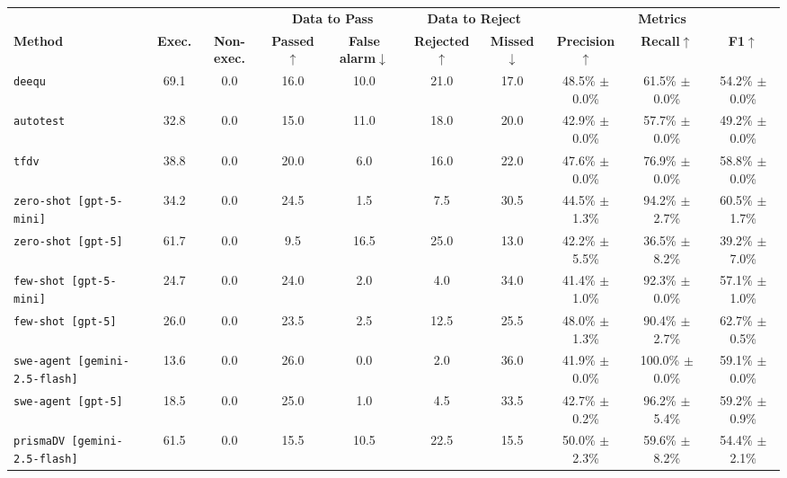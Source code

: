 \documentclass[10pt]{article}
\begin{document}
\begin{table}[t]
\centering
\renewcommand{\arraystretch}{1.1}
\setlength{\tabcolsep}{4pt}
\small
\begin{tabular}{l c c | c c | c c | c c c}
\toprule
& & & \multicolumn{2}{c|}{\textbf{Data to Pass}} & \multicolumn{2}{c|}{\textbf{Data to Reject}} & \multicolumn{3}{c}{\textbf{Metrics}} \\
\textbf{Method} & \textbf{Exec.} & \textbf{Non-exec.}
& \textbf{Passed$\uparrow$} & \textbf{False alarm$\downarrow$}
& \textbf{Rejected$\uparrow$} & \textbf{Missed$\downarrow$}
& \textbf{Precision$\uparrow$} & \textbf{Recall$\uparrow$} & \textbf{F1$\uparrow$} \\
\midrule
        \texttt{deequ} & 69.1 & 0.0 & 16.0 & 10.0 & 21.0 & 17.0 & 48.5\% $\pm$ 0.0\% & 61.5\% $\pm$ 0.0\% & 54.2\% $\pm$ 0.0\% \\
        \midrule
        \texttt{autotest} & 32.8 & 0.0 & 15.0 & 11.0 & 18.0 & 20.0 & 42.9\% $\pm$ 0.0\% & 57.7\% $\pm$ 0.0\% & 49.2\% $\pm$ 0.0\% \\
        \midrule
        \texttt{tfdv} & 38.8 & 0.0 & 20.0 & 6.0 & 16.0 & 22.0 & 47.6\% $\pm$ 0.0\% & 76.9\% $\pm$ 0.0\% & 58.8\% $\pm$ 0.0\% \\
        \midrule
        \texttt{zero-shot [gpt-5-mini]} & 34.2 & 0.0 & 24.5 & 1.5 & 7.5 & 30.5 & 44.5\% $\pm$ 1.3\% & 94.2\% $\pm$ 2.7\% & 60.5\% $\pm$ 1.7\% \\
        \texttt{zero-shot [gpt-5]} & 61.7 & 0.0 & 9.5 & 16.5 & 25.0 & 13.0 & 42.2\% $\pm$ 5.5\% & 36.5\% $\pm$ 8.2\% & 39.2\% $\pm$ 7.0\% \\
        \midrule
        \texttt{few-shot [gpt-5-mini]} & 24.7 & 0.0 & 24.0 & 2.0 & 4.0 & 34.0 & 41.4\% $\pm$ 1.0\% & 92.3\% $\pm$ 0.0\% & 57.1\% $\pm$ 1.0\% \\
        \texttt{few-shot [gpt-5]} & 26.0 & 0.0 & 23.5 & 2.5 & 12.5 & 25.5 & 48.0\% $\pm$ 1.3\% & 90.4\% $\pm$ 2.7\% & 62.7\% $\pm$ 0.5\% \\
        \midrule
        \texttt{swe-agent [gemini-2.5-flash]} & 13.6 & 0.0 & 26.0 & 0.0 & 2.0 & 36.0 & 41.9\% $\pm$ 0.0\% & 100.0\% $\pm$ 0.0\% & 59.1\% $\pm$ 0.0\% \\
        \texttt{swe-agent [gpt-5]} & 18.5 & 0.0 & 25.0 & 1.0 & 4.5 & 33.5 & 42.7\% $\pm$ 0.2\% & 96.2\% $\pm$ 5.4\% & 59.2\% $\pm$ 0.9\% \\
        \midrule
        \texttt{prismaDV [gemini-2.5-flash]} & 61.5 & 0.0 & 15.5 & 10.5 & 22.5 & 15.5 & 50.0\% $\pm$ 2.3\% & 59.6\% $\pm$ 8.2\% & 54.4\% $\pm$ 2.1\% \\

\end{tabular}
\end{table}
\end{document}
